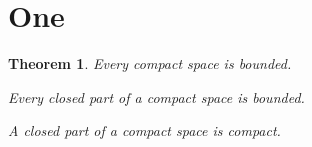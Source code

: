 \documentclass{article}
\newtheorem{thm}{Theorem}[section]
\begin{document}
\section{One}
\begin{thm}\label{main} Every compact space is bounded. \end{thm}

 {\em Every closed part of a compact
space is bounded.}

 {\em A closed part of a compact space is compact.}
\end{document}
